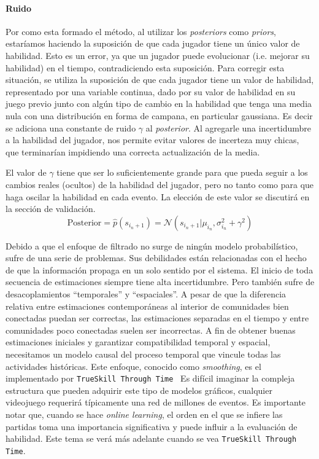 \documentclass[11pt,twoside,spanish]{report} %
\begin{document}
\paragraph{Ruido}
Por como esta formado el m\'etodo, al utilizar los \textit{posteriors} como \textit{priors}, estar\'iamos haciendo la suposici\'on de que cada jugador tiene un \'unico valor de habilidad.
Esto es un error, ya que un jugador puede evolucionar (i.e. mejorar su habilidad) en el tiempo, contradiciendo esta suposici\'on.
Para corregir esta situaci\'on, se utiliza la suposici\'on de que cada jugador tiene un valor de habilidad, representado por una variable continua, dado por su valor de habilidad en su juego previo junto con alg\'un tipo de cambio en la habilidad que tenga una media nula con una distribuci\'on en forma de campana, en particular gaussiana.
Es decir se adiciona una constante de ruido $\gamma$ al \textit{posterior}.
Al agregarle una incertidumbre a la habilidad del jugador, nos permite evitar valores de incerteza muy chicas, que terminar\'ian impidiendo una correcta actualizaci\'on de la media.

El valor de $\gamma$ tiene que ser lo suficientemente grande para que pueda seguir a los cambios reales (ocultos) de la habilidad del jugador, pero no tanto como para que haga oscilar la habilidad en cada evento.
La elecci\'on de este valor se discutir\'a en la secci\'on de validaci\'on.
\begin{equation}
	\text{Posterior}= \widehat{p}(s_{i_n+1}) = \mathcal{N}(s_{i_n+1} | \mu_{i_{n}}, \sigma_{i_{n}}^2 + \gamma^2 )
\end{equation}

Debido a que el enfoque de filtrado no surge de ning\'un modelo probabil\'istico, sufre de una serie de problemas.
Sus debilidades est\'an relacionadas con el hecho de que la informaci\'on propaga en un solo sentido por el sistema.
El inicio de toda secuencia de estimaciones siempre tiene alta incertidumbre.
Pero tambi\'en sufre de desacoplamientos ``temporales'' y ``espaciales''.
A pesar de que la diferencia relativa entre estimaciones contempor\'aneas al interior de comunidades bien conectadas puedan ser correctas, las estimaciones separadas en el tiempo y entre comunidades poco conectadas suelen ser incorrectas.
A fin de obtener buenas estimaciones iniciales y garantizar compatibilidad temporal y espacial, necesitamos un modelo causal del proceso temporal que vincule todas las actividades hist\'oricas.
Este enfoque, conocido como \emph{smoothing}, es el implementado por \texttt{TrueSkill Through Time}~\cite{Dangauthier2007}
Es dif\'icil imaginar la compleja estructura que pueden adquirir este tipo de modelos gr\'aficos, cualquier videojuego requerir\'a t\'ipicamente una red de millones de eventos.
Es importante notar que, cuando se hace \textit{online learning}, el orden en el que se infiere las partidas toma una importancia significativa y puede influir a la evaluaci\'on de habilidad.
Este tema se ver\'a m\'as adelante cuando se vea \texttt{TrueSkill Through Time}.
\end{document}
